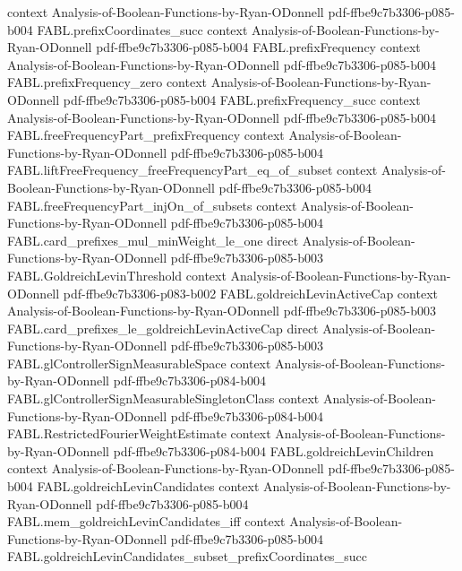 \begin{theorem}
  {context}
  {Analysis-of-Boolean-Functions-by-Ryan-ODonnell}
  {pdf-ffbe9c7b3306-p085-b004}
\proofstep
  {FABL.prefixCoordinates_succ}
  {context}
  {Analysis-of-Boolean-Functions-by-Ryan-ODonnell}
  {pdf-ffbe9c7b3306-p085-b004}
\proofstep
  {FABL.prefixFrequency}
  {context}
  {Analysis-of-Boolean-Functions-by-Ryan-ODonnell}
  {pdf-ffbe9c7b3306-p085-b004}
\proofstep
  {FABL.prefixFrequency_zero}
  {context}
  {Analysis-of-Boolean-Functions-by-Ryan-ODonnell}
  {pdf-ffbe9c7b3306-p085-b004}
\proofstep
  {FABL.prefixFrequency_succ}
  {context}
  {Analysis-of-Boolean-Functions-by-Ryan-ODonnell}
  {pdf-ffbe9c7b3306-p085-b004}
\proofstep
  {FABL.freeFrequencyPart_prefixFrequency}
  {context}
  {Analysis-of-Boolean-Functions-by-Ryan-ODonnell}
  {pdf-ffbe9c7b3306-p085-b004}
\proofstep
  {FABL.liftFreeFrequency_freeFrequencyPart_eq_of_subset}
  {context}
  {Analysis-of-Boolean-Functions-by-Ryan-ODonnell}
  {pdf-ffbe9c7b3306-p085-b004}
\proofstep
  {FABL.freeFrequencyPart_injOn_of_subsets}
  {context}
  {Analysis-of-Boolean-Functions-by-Ryan-ODonnell}
  {pdf-ffbe9c7b3306-p085-b004}
\proofstep
  {FABL.card_prefixes_mul_minWeight_le_one}
  {direct}
  {Analysis-of-Boolean-Functions-by-Ryan-ODonnell}
  {pdf-ffbe9c7b3306-p085-b003}
\proofstep
  {FABL.GoldreichLevinThreshold}
  {context}
  {Analysis-of-Boolean-Functions-by-Ryan-ODonnell}
  {pdf-ffbe9c7b3306-p083-b002}
\proofstep
  {FABL.goldreichLevinActiveCap}
  {context}
  {Analysis-of-Boolean-Functions-by-Ryan-ODonnell}
  {pdf-ffbe9c7b3306-p085-b003}
\proofstep
  {FABL.card_prefixes_le_goldreichLevinActiveCap}
  {direct}
  {Analysis-of-Boolean-Functions-by-Ryan-ODonnell}
  {pdf-ffbe9c7b3306-p085-b003}
\proofstep
  {FABL.glControllerSignMeasurableSpace}
  {context}
  {Analysis-of-Boolean-Functions-by-Ryan-ODonnell}
  {pdf-ffbe9c7b3306-p084-b004}
\proofstep
  {FABL.glControllerSignMeasurableSingletonClass}
  {context}
  {Analysis-of-Boolean-Functions-by-Ryan-ODonnell}
  {pdf-ffbe9c7b3306-p084-b004}
\proofstep
  {FABL.RestrictedFourierWeightEstimate}
  {context}
  {Analysis-of-Boolean-Functions-by-Ryan-ODonnell}
  {pdf-ffbe9c7b3306-p084-b004}
\proofstep
  {FABL.goldreichLevinChildren}
  {context}
  {Analysis-of-Boolean-Functions-by-Ryan-ODonnell}
  {pdf-ffbe9c7b3306-p085-b004}
\proofstep
  {FABL.goldreichLevinCandidates}
  {context}
  {Analysis-of-Boolean-Functions-by-Ryan-ODonnell}
  {pdf-ffbe9c7b3306-p085-b004}
\proofstep
  {FABL.mem_goldreichLevinCandidates_iff}
  {context}
  {Analysis-of-Boolean-Functions-by-Ryan-ODonnell}
  {pdf-ffbe9c7b3306-p085-b004}
\proofstep
  {FABL.goldreichLevinCandidates_subset_prefixCoordinates_succ}

\end{theorem}
